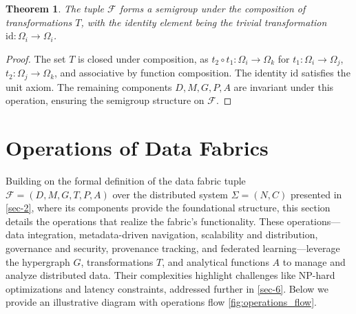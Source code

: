 \documentclass{amsart}
\newtheorem{thm}{Theorem}
\newcommand\cF{\mathcal{F}}
\begin{document}
\begin{thm}
The tuple \( \cF \) forms a semigroup under the composition of transformations \( T \), with the identity element being the trivial transformation \( \text{id}: \Omega_i \to \Omega_i \).
\end{thm}

\begin{proof}
The set \( T \) is closed under composition, as \( t_2 \circ t_1: \Omega_i \to \Omega_k \) for \( t_1: \Omega_i \to \Omega_j \), \( t_2: \Omega_j \to \Omega_k \), and associative by function composition. The identity \( \text{id} \) satisfies the unit axiom. The remaining components \( D, M, G, P, A \) are invariant under this operation, ensuring the semigroup structure on \( \cF \).
\end{proof}



 
\section{Operations of Data Fabrics} \label{sec-3}
Building on the formal definition of the data fabric tuple \( \cF = (D, M, G, T, P, A) \) over the distributed system \( \Sigma = (N, C) \) presented in \cref{sec-2}, where its components   provide the foundational structure, this section details the operations that realize the fabric's functionality. 
%
These operations—data integration, metadata-driven navigation, scalability and distribution, governance and security, provenance tracking, and federated learning—leverage the hypergraph \( G \), transformations \( T \), and analytical functions \( A \) to manage and analyze distributed data. 
%
Their complexities highlight challenges like NP-hard optimizations and latency constraints, addressed further in \cref{sec-6}. 
Below we provide an illustrative diagram  with operations flow  \cref{fig:operations_flow}.
\end{document}
